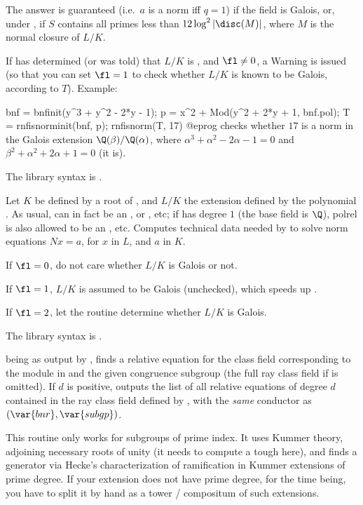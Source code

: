 The answer is guaranteed (i.e.~$a$ is a norm iff $q = 1$) if the field is
Galois, or, under , if $S$ contains all primes less than
$12\log^2\left|\disc(M)\right|$, where $M$ is the normal
closure of $L/K$.

If  has determined (or was told) that $L/K$ is
, and $\fl \neq 0$, a Warning is issued (so that you can set
$\fl = 1$ to check whether $L/K$ is known to be Galois, according to $T$).
Example:

\bprog
bnf = bnfinit(y^3 + y^2 - 2*y - 1);
p = x^2 + Mod(y^2 + 2*y + 1, bnf.pol);
T = rnfisnorminit(bnf, p);
rnfisnorm(T, 17)
@eprog\noindent
checks whether $17$ is a norm in the Galois extension $\Q(\beta) /
\Q(\alpha)$, where $\alpha^3 + \alpha^2 - 2\alpha - 1 = 0$ and $\beta^2 +
\alpha^2 + 2\alpha + 1 = 0$ (it is).

The library syntax is .

\label{se:rnfisnorminit}
Let $K$ be defined by a root of , and $L/K$ the extension defined
by the polynomial . As usual,  can in fact be an ,
or , etc; if  has degree $1$ (the base field is $\Q$),
polrel is also allowed to be an , etc. Computes technical data needed
by  to solve norm equations $Nx = a$, for $x$ in $L$, and $a$
in $K$.

If $\fl = 0$, do not care whether $L/K$ is Galois or not.

If $\fl = 1$, $L/K$ is assumed to be Galois (unchecked), which speeds up
.

If $\fl = 2$, let the routine determine whether $L/K$ is Galois.

The library syntax is .

\label{se:rnfkummer}
being as output by , finds a relative equation for the
class field corresponding to the module in  and the given
congruence subgroup (the full ray class field if  is omitted).
If $d$ is positive, outputs the list of all relative equations of
degree $d$ contained in the ray class field defined by , with
the \emph{same} conductor as $(\var{bnr}, \var{subgp})$.

 This routine only works for subgroups of prime index. It
uses Kummer theory, adjoining necessary roots of unity (it needs to compute a
tough  here), and finds a generator via Hecke's characterization
of ramification in Kummer extensions of prime degree. If your extension does
not have prime degree, for the time being, you have to split it by hand as a
tower / compositum of such extensions.

